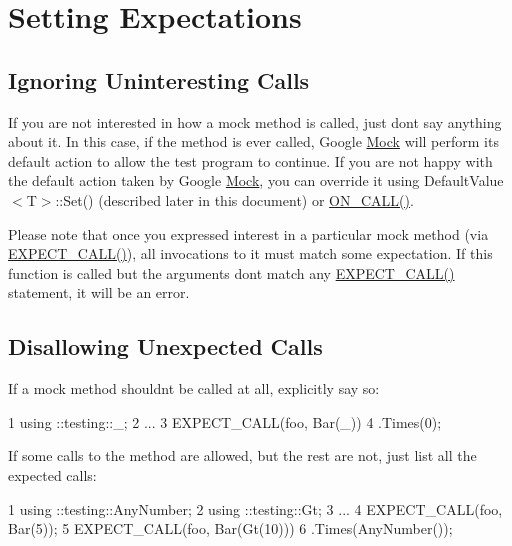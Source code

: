 \section*{Setting Expectations}

\subsection*{Ignoring Uninteresting Calls}

If you are not interested in how a mock method is called, just don\textquotesingle{}t say anything about it. In this case, if the method is ever called, Google \hyperlink{classMock}{Mock} will perform its default action to allow the test program to continue. If you are not happy with the default action taken by Google \hyperlink{classMock}{Mock}, you can override it using {\ttfamily Default\+Value$<$T$>$\+::\+Set()} (described later in this document) or {\ttfamily \hyperlink{gmock-spec-builders_8h_a5b12ae6cf84f0a544ca811b380c37334}{O\+N\+\_\+\+C\+A\+L\+L()}}.

Please note that once you expressed interest in a particular mock method (via {\ttfamily \hyperlink{gmock-spec-builders_8h_a535a6156de72c1a2e25a127e38ee5232}{E\+X\+P\+E\+C\+T\+\_\+\+C\+A\+L\+L()}}), all invocations to it must match some expectation. If this function is called but the arguments don\textquotesingle{}t match any {\ttfamily \hyperlink{gmock-spec-builders_8h_a535a6156de72c1a2e25a127e38ee5232}{E\+X\+P\+E\+C\+T\+\_\+\+C\+A\+L\+L()}} statement, it will be an error.

\subsection*{Disallowing Unexpected Calls}

If a mock method shouldn\textquotesingle{}t be called at all, explicitly say so\+:


\begin{DoxyCode}
1 using ::testing::\_;
2 ...
3   EXPECT\_CALL(foo, Bar(\_))
4       .Times(0);
\end{DoxyCode}


If some calls to the method are allowed, but the rest are not, just list all the expected calls\+:


\begin{DoxyCode}
1 using ::testing::AnyNumber;
2 using ::testing::Gt;
3 ...
4   EXPECT\_CALL(foo, Bar(5));
5   EXPECT\_CALL(foo, Bar(Gt(10)))
6       .Times(AnyNumber());
\end{DoxyCode}


